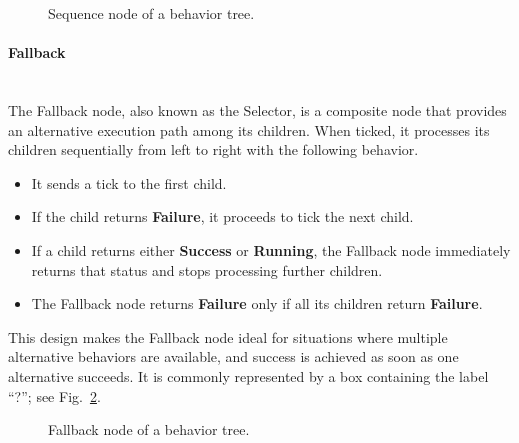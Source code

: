 \documentclass{CSSRforAfrica}
\begin{document}
\begin{figure}[th]
\vspace{5mm}
    \centering
    \caption{Sequence node of a behavior tree.}
    \label{fig:sequence}
\end{figure}




\paragraph{Fallback}~\\
The Fallback node, also known as the Selector, is a composite node that provides an alternative execution path among its children. When ticked, it processes its children sequentially from left to right with the following behavior.\\
\begin{itemize}
    \item It sends a tick to the first child.
    \item If the child returns \textbf{Failure}, it proceeds to tick the next child.
    \item If a child returns either \textbf{Success} or \textbf{Running}, the Fallback node immediately returns that status and stops processing further children.
    \item The Fallback node returns \textbf{Failure} only if all its children return \textbf{Failure}.
\end{itemize}
This design makes the Fallback node ideal for situations where multiple alternative behaviors are available, and success is achieved as soon as one alternative succeeds. It is commonly represented by a box containing the label ``?''; see Fig.~\ref{fig:fallback}.

\begin{figure}[h]
\vspace{5mm}
    \centering
    
    \caption{Fallback node of a behavior tree.}
    \label{fig:fallback}
\end{figure}
\end{document}
